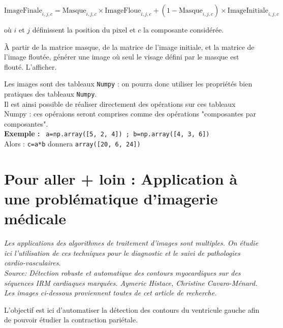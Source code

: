 $$\text{ImageFinale}_{i,j,c} = \text{Masque}_{i,j,c} \times \text{ImageFloue}_{i,j,c}  + (1-\text{Masque}_{i,j,c}) \times \text{ImageInitiale}_{i,j,c}$$  

où $i$ et $j$ définissent la position du pixel et $c$ la composante considérée.

\begin{question}
À partir de la matrice masque, de la matrice de l'image initiale, et la matrice de l'image floutée, générer une image où seul le visage défini par le masque est flouté. L'afficher.
\end{question}

\begin{remarque}
Les images sont des tableaux \texttt{Numpy} : on pourra donc utiliser les propriétés bien pratiques des tableaux \texttt{Numpy}.\\
Il est ainsi possible de réaliser directement des opérations sur ces tableaux Numpy :  ces opéraions seront comprises comme des opérations "composantes par composantes".\\
\textbf{Exemple :} \texttt{ a=np.array([5, 2, 4]) ; b=np.array([4, 3, 6])}     \\
       Alors  : \texttt{c=a*b} donnera \texttt{array([20, 6, 24])} 

\end{remarque}


\section*{Pour aller + loin : Application à une problématique d'imagerie médicale}


\textit{
Les applications des algorithmes de traitement d'images sont multiples. On étudie ici l'utilisation de ces techniques pour le diagnostic et le suivi de pathologies cardio-vasculaires.}
\\
\textit{Source: Détection robuste et automatique des contours myocardiques sur des séquences IRM cardiaques marquées. Aymeric Histace, Christine Cavaro-Ménard. Les images ci-dessous proviennent toutes de cet article de recherche.}



\begin{obj}
L'objectif est ici d'automatiser la détection des contours du ventricule gauche afin de pouvoir étudier la contraction pariétale.
\end{obj}

